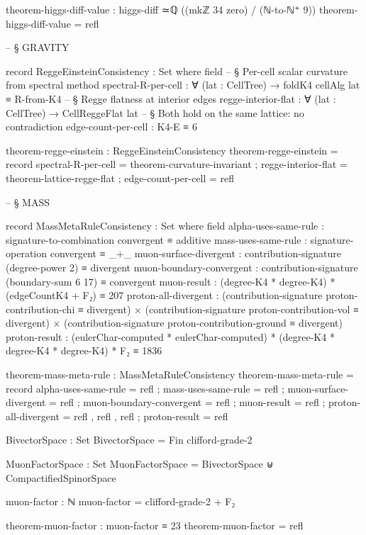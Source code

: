 \documentclass[11pt,a4paper]{book}
\begin{document}
\begin{code}
theorem-higgs-diff-value : higgs-diff ≃ℚ ((mkℤ 34 zero) / (ℕ-to-ℕ⁺ 9))
theorem-higgs-diff-value = refl


-- § GRAVITY

record ReggeEinsteinConsistency : Set where
  field
    -- § Per-cell scalar curvature from spectral method
    spectral-R-per-cell : ∀ (lat : CellTree) →
                          foldK4 cellAlg lat ≡ R-from-K4
    -- § Regge flatness at interior edges
    regge-interior-flat : ∀ (lat : CellTree) → CellReggeFlat lat
    -- § Both hold on the same lattice: no contradiction
    edge-count-per-cell : K4-E ≡ 6

theorem-regge-einstein : ReggeEinsteinConsistency
theorem-regge-einstein = record
  { spectral-R-per-cell = theorem-curvature-invariant
  ; regge-interior-flat = theorem-lattice-regge-flat
  ; edge-count-per-cell = refl
  }


-- § MASS

record MassMetaRuleConsistency : Set where
  field
    alpha-uses-same-rule     : signature-to-combination convergent ≡ additive
    mass-uses-same-rule      : signature-operation convergent ≡ _+_
    muon-surface-divergent   : contribution-signature (degree-power 2) ≡ divergent
    muon-boundary-convergent : contribution-signature (boundary-sum 6 17) ≡ convergent
    muon-result              : (degree-K4 * degree-K4) * (edgeCountK4 + F₂) ≡ 207
    proton-all-divergent     : (contribution-signature proton-contribution-chi ≡ divergent) ×
                               (contribution-signature proton-contribution-vol ≡ divergent) ×
                               (contribution-signature proton-contribution-ground ≡ divergent)
    proton-result            : (eulerChar-computed * eulerChar-computed) * (degree-K4 * degree-K4 * degree-K4) * F₂ ≡ 1836

theorem-mass-meta-rule : MassMetaRuleConsistency
theorem-mass-meta-rule = record
  { alpha-uses-same-rule     = refl
  ; mass-uses-same-rule      = refl
  ; muon-surface-divergent   = refl
  ; muon-boundary-convergent = refl
  ; muon-result              = refl
  ; proton-all-divergent     = refl , refl , refl
  ; proton-result            = refl
  }

BivectorSpace : Set
BivectorSpace = Fin clifford-grade-2

MuonFactorSpace : Set
MuonFactorSpace = BivectorSpace ⊎ CompactifiedSpinorSpace

muon-factor : ℕ
muon-factor = clifford-grade-2 + F₂

theorem-muon-factor : muon-factor ≡ 23
theorem-muon-factor = refl


\end{code}
\end{document}
